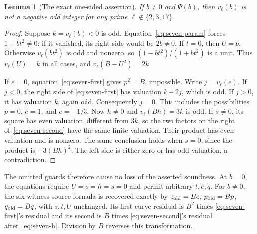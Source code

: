 \documentclass[11pt]{article}
\newtheorem{lemma}[theorem]{Lemma}
\theoremstyle{definition}
\theoremstyle{remark}
\begin{document}
\begin{lemma}[The exact one-sided assertion]
\label{lem:original-seven-parity-soundness}
If $b\ne0$ and $\Psi(b)$, then $v_\ell(b)$ is not a negative odd
integer for any prime $\ell\notin\{2,3,17\}$.
\end{lemma}
\begin{proof}
Suppose $k=v_\ell(b)<0$ is odd. Equation~\eqref{eq:seven-param}
forces $1+bt^2\ne0$: if it vanished, its right side would be $2b\ne0$.
If $t=0$, then $U=b$. Otherwise $v_\ell(bt^2)$ is odd and nonzero,
so $(1-bt^2)/(1+bt^2)$ is a unit. Thus $v_\ell(U)=k$ in all cases,
and $v_\ell(B-U^2)=2k$.

If $e=0$, equation~\eqref{eq:seven-first} gives $p^2=B$, impossible.
Write $j=v_\ell(e)$. If $j<0$, the right side of
\eqref{eq:seven-first} has valuation $k+2j$, which is odd.
If $j>0$, it has valuation $k$, again odd. Consequently $j=0$.
This includes the possibilities $p=0$, $e=1$, and $e=-1/3$.
Now $h\ne0$ and $v_\ell(Bh)=3k$ is odd. If $s\ne0$, its square
has even valuation, different from $3k$, so the two factors on the
right of~\eqref{eq:seven-second} have the same finite valuation.
Their product has even valuation and is nonzero. The same conclusion
holds when $s=0$, since the product is $-3(Bh)^2$.
The left side is either zero or has odd valuation, a contradiction.
\end{proof}

The omitted guards therefore cause no loss of the asserted soundness.
At $b=0$, the equations require $U=p=h=s=0$ and permit arbitrary
$t,e,q$. For $b\ne0$, the six-witness source formula is recovered
exactly by $e_{\rm old}=Be$, $p_{\rm old}=Bp$, $q_{\rm old}=Bq$,
with $s,t,U$ unchanged. Its first curve residual is $B^2$ times
\eqref{eq:seven-first}'s residual and its second is $B$ times
\eqref{eq:seven-second}'s residual after~\eqref{eq:seven-h}.
Division by $B$ reverses this transformation.
\end{document}
